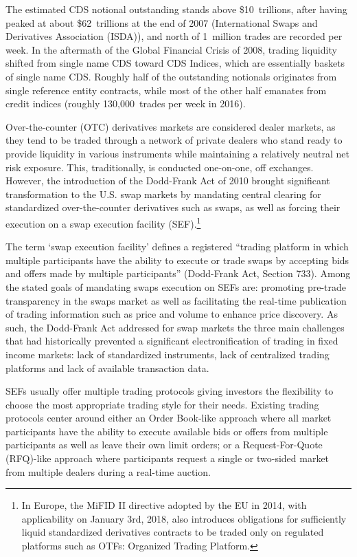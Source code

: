\begin{enumerate}
The estimated CDS notional outstanding stands above \$10~trillions, after having peaked at about \$62~trillions at the end of 2007 (International Swaps and Derivatives Association (ISDA)), and north of 1~million trades are recorded per week. In the aftermath of the Global Financial Crisis of 2008, trading liquidity shifted from single name CDS toward CDS Indices, which are essentially baskets of single name CDS. Roughly half of the outstanding notionals originates from single reference entity contracts, while most of the other half emanates from credit indices (roughly 130,000~trades per week in 2016).


Over-the-counter (OTC) derivatives markets are considered dealer markets, as they tend to be traded through a network of private dealers who stand ready to provide liquidity in various instruments while maintaining a relatively neutral net risk exposure. This, traditionally, is conducted one-on-one, off exchanges. However, the introduction of the Dodd-Frank Act of 2010 brought significant transformation to the U.S. swap markets by mandating central clearing for standardized over-the-counter derivatives such as swaps, as well as forcing their execution on a swap execution facility (SEF).\footnote{In Europe, the MiFID II directive adopted by the EU in 2014, with applicability on January 3rd, 2018, also introduces obligations for sufficiently liquid standardized derivatives contracts to be traded only on regulated platforms such as OTFs: Organized Trading Platform.}


The term `swap execution facility' defines a registered ``trading platform in which multiple participants have the ability to execute or trade swaps by accepting bids and offers made by multiple participants'' (Dodd-Frank Act, Section 733). Among the stated goals of mandating swaps execution on SEFs are: promoting pre-trade transparency in the swaps market as well as facilitating the real-time publication of trading information such as price and volume to enhance price discovery. As such, the Dodd-Frank Act addressed for swap markets the three main challenges that had historically prevented a significant electronification of trading in fixed income markets: lack of standardized instruments, lack of centralized trading platforms and lack of available transaction data.


SEFs usually offer multiple trading protocols giving investors the flexibility to choose the most appropriate trading style for their needs. Existing trading protocols center around either an Order Book-like approach where all market participants have the ability to execute available bids or offers from multiple participants as well as leave their own limit orders; or a Request-For-Quote (RFQ)-like approach where participants request a single or two-sided market from multiple dealers during a real-time auction.



\end{enumerate}

